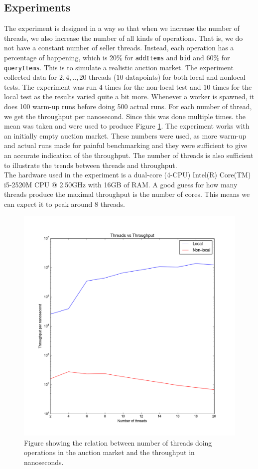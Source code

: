 \documentclass[a4paper]{article}
\begin{document}
\subsection{Experiments}
The experiment is designed in a way so that when we increase the number of threads, we also increase the number of all kinds of operations. That is, we do not have a constant number of seller threads. Instead, each operation has a percentage of happening, which is $20\%$ for \texttt{addItems} and \texttt{bid} and $60\%$ for \texttt{queryItems}. This is to simulate a realistic auction market. The experiment collected data for $2,4,..,20$ threads ($10$ datapoints) for both local and nonlocal tests. The experiment was run $4$ times for the non-local test and $10$ times for the local test as the results varied quite a bit more. Whenever a worker is spawned, it does 100 warm-up runs before doing 500 actual runs. For each number of thread, we get the throughput per nanosecond. Since this was done multiple times. the mean was taken and were used to produce Figure \ref{fig}. The experiment works with an initially empty auction market. These numbers were used, as more warm-up and actual runs made for painful benchmarking and they were sufficient to give an accurate indication of the throughput. The number of threads is also sufficient to illustrate the trends between threads and throughput. \\
The hardware used in the experiment is a dual-core (4-CPU) Intel(R) Core(TM) i5-2520M CPU @ 2.50GHz with 16GB of RAM. A good guess for how many threads produce the maximal throughput is the number of cores. This means we can expect it to peak around $8$ threads.
\begin{figure}[H]
  \centering
  \includegraphics[scale=0.6]{fig1}
  \caption{Figure showing the relation between number of threads doing operations in the auction market and the throughput in nanoseconds.}
  \label{fig}
\end{figure}
\end{document}

